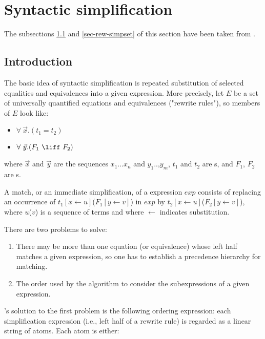 \section{Syntactic simplification}
\label{sec-rew}

The subsections \ref{sec-rew-intro} and \ref{sec-rew-simpset} 
of this section have been taken from \cite{rww3}.


\subsection{Introduction}
\label{sec-rew-intro}

The basic idea  of syntactic simplification is repeated substitution of 
selected equalities and equivalences into a given expression.
More precisely, let $E$ be a set of universally quantified equations and 
equivalences ("rewrite rules"), so members of $E$ look like:
\begin{itemize}
\item $\forall\ {\vec x}.(t_1=t_2)$
\item $\forall\ {\vec y}.(F_1\ \liff \ F_2)$
\end{itemize}
where ${\vec x}$ and ${\vec y}$ are the {\indvar} sequences $x_1$...$x_n$
and $y_1$..,$y_m$, $t_1$ and $t_2$ are {\term}s, and $F_1$, $F_2$ are {\wff}s.

A match, or an immediate simplification, of a {{\GF}} expression $exp$ consists
 of replacing an occurrence of $t_1[x \leftarrow u]$($F_1[y \leftarrow v]$) 
in $exp$ by $t_2[x \leftarrow u]$($F_2[y \leftarrow v]$), where $u$($v$) is a 
sequence of terms and where $\leftarrow$ indicates substitution.

There are two problems to solve:
\begin{enumerate}
\item There may be more than one equation (or equivalence) whose left half 
      matches a given expression, so one has to establish a precedence 
      hierarchy for matching.

\item The order used by the algorithm to consider the subexpressions of a 
      given expression.
\end{enumerate}

{{\GF}}'s solution to the first problem is the following ordering expression:
each simplification expression (i.e., left half of a rewrite rule) is 
regarded as a linear string of atoms.
Each atom is either:

